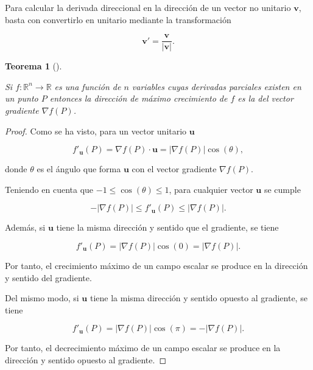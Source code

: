 \documentclass[
  a4paper,
]{scrreport}
\theoremstyle{definition}
\theoremstyle{plain}
\newtheorem{theorem}{Teorema}[chapter]
\theoremstyle{plain}
\theoremstyle{definition}
\theoremstyle{definition}
\theoremstyle{plain}
\theoremstyle{remark}
\begin{document}
Para calcular la derivada direccional en la dirección de un vector no
unitario \(\mathbf{v}\), basta con convertirlo en unitario mediante la
transformación

\[
\mathbf{v'}=\frac{\mathbf{v}}{|\mathbf{v}|}.
\]

\begin{theorem}[]\protect\hypertarget{thm-gradiente-direccion-maximo-crecimiento}{}\label{thm-gradiente-direccion-maximo-crecimiento}

Si \(f:\mathbb{R}^n\rightarrow \mathbb{R}\) es una función de \(n\)
variables cuyas derivadas parciales existen en un punto \(P\) entonces
la dirección de máximo crecimiento de \(f\) es la del vector gradiente
\(\nabla f(P)\).

\end{theorem}

\begin{tcolorbox}[enhanced jigsaw, breakable, title=\textcolor{quarto-callout-note-color}{\faInfo}\hspace{0.5em}{Demostración}, toprule=.15mm, coltitle=black, arc=.35mm, rightrule=.15mm, colframe=quarto-callout-note-color-frame, colbacktitle=quarto-callout-note-color!10!white, toptitle=1mm, titlerule=0mm, leftrule=.75mm, opacityback=0, colback=white, bottomrule=.15mm, bottomtitle=1mm, left=2mm, opacitybacktitle=0.6]

\begin{proof}

Como se ha visto, para un vector unitario \(\mathbf{u}\)

\[
f'_{\mathbf{u}}(P) = \nabla f(P)\cdot \mathbf{u} = |\nabla f(P)|\cos(\theta),
\]

donde \(\theta\) es el ángulo que forma \(\mathbf{u}\) con el vector
gradiente \(\nabla f(P)\).

Teniendo en cuenta que \(-1\leq \cos(\theta)\leq 1\), para cualquier
vector \(\mathbf{u}\) se cumple

\[
-|\nabla f(P)|\leq f'_{\mathbf{u}}(P)\leq |\nabla f(P)|.
\]

Además, si \(\mathbf{u}\) tiene la misma dirección y sentido que el
gradiente, se tiene

\[
f'_{\mathbf{u}}(P)=|\nabla f(P)| \cos(0)= |\nabla f(P)|.
\]

Por tanto, el crecimiento máximo de un campo escalar se produce en la
dirección y sentido del gradiente.

Del mismo modo, si \(\mathbf{u}\) tiene la misma dirección y sentido
opuesto al gradiente, se tiene

\[
f'_{\mathbf{u}}(P)=|\nabla f(P)| \cos(\pi)=-|\nabla f(P)|.
\]

Por tanto, el decrecimiento máximo de un campo escalar se produce en la
dirección y sentido opuesto al gradiente.

\end{proof}

\end{tcolorbox}
\end{document}
